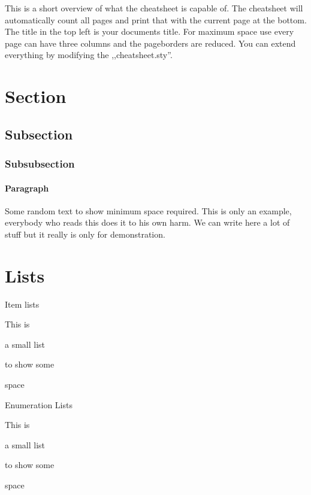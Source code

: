 \documentclass[a4paper]{article}
\begin{document}
\begin{multicols}{3}\scriptsize

    This is a short overview of what the cheatsheet is capable of. 
    The cheatsheet will automatically count all pages and print that with the current page at the bottom. The title in the top left is your documents title. 
    For maximum space use every page can have three columns and the pageborders are reduced.
    You can extend everything by modifying the ,,cheatsheet.sty''. 

    \section{Section}
    \subsection{Subsection}
    \subsubsection{Subsubsection}
    \paragraph{Paragraph}
    Some random text to show minimum space required. This is only an example, everybody who reads this does it to his own harm. We can write here a lot of stuff but it really is only for demonstration.

    \section{Lists}
    Item lists
    \begin{itemize*}
        \item This is
        \item a small list
        \item to show some
        \item space
    \end{itemize*}

    Enumeration Lists
    \begin{enumerate*}
        \item This is
        \item a small list
        \item to show some
        \item space
    \end{enumerate*}


\end{multicols}
\end{document}
